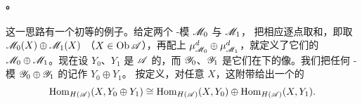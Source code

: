 \paragraph{\trDirectSum。}\label{sub:direct-sum}
这一思路有一个初等的例子。给定两个 \trAinfty-模 $\mathscr{M}_0$ 与 $\mathscr{M}_1$，
把相应\trGraded\trVectorSpace{}逐点取和，即取 $\mathscr{M}_0(X)\oplus\mathscr{M}_1(X)$
（$X\in\operatorname{Ob}\mathscr{A}$），再配上\trStructureMap{}%
$\mu^d_{\mathscr{M}_0}\oplus\mu^d_{\mathscr{M}_1}$，就定义了它们的\trDirectSum{}%
$\mathscr{M}_0\oplus\mathscr{M}_1$。现在设 $Y_0$、$Y_1$ 是 $\mathscr{A}$ 的\trObject，而%
$\mathscr{Y}_0$、$\mathscr{Y}_1$ 是它们在\trYonedaEmbedding{}下的像。我们把任何\trQuasiRepresent%
\trAinfty-模 $\mathscr{Y}_0\oplus\mathscr{Y}_1$ 的\trObject{}记作 $Y_0\oplus Y_1$。
按定义，对任意 $X$，这附带给出一个\trCanonical{}的\trIsomorphism
\begin{equation*}
\operatorname{Hom}_{H(\mathscr{A})}(X,Y_0\oplus Y_1)\cong
\operatorname{Hom}_{H(\mathscr{A})}(X,Y_0)\oplus\operatorname{Hom}_{H(\mathscr{A})}(X,Y_1).
\end{equation*}
